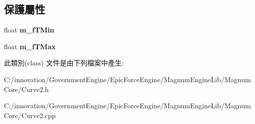 \subsection*{保護屬性}
\begin{DoxyCompactItemize}
\item 
float {\bfseries m\+\_\+f\+T\+Min}\hypertarget{class_i_dream_sky_1_1_curve2_a760deca9f1c5070a3386750488a09e32}{}\label{class_i_dream_sky_1_1_curve2_a760deca9f1c5070a3386750488a09e32}

\item 
float {\bfseries m\+\_\+f\+T\+Max}\hypertarget{class_i_dream_sky_1_1_curve2_a7596532512dbd19a10762781f018dc4e}{}\label{class_i_dream_sky_1_1_curve2_a7596532512dbd19a10762781f018dc4e}

\end{DoxyCompactItemize}


此類別(class) 文件是由下列檔案中產生\+:\begin{DoxyCompactItemize}
\item 
C\+:/innovation/\+Government\+Engine/\+Epic\+Force\+Engine/\+Magnum\+Engine\+Lib/\+Magnum\+Core/Curve2.\+h\item 
C\+:/innovation/\+Government\+Engine/\+Epic\+Force\+Engine/\+Magnum\+Engine\+Lib/\+Magnum\+Core/Curve2.\+cpp\end{DoxyCompactItemize}
